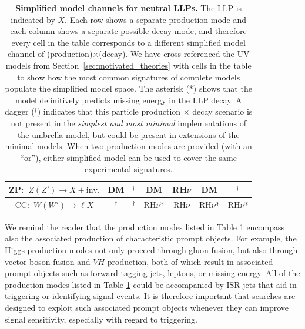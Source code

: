 \begin{table}
\begin{center}
\begin{tabular}{ |c|c|c|c|c|c|c| }
 \hline 
 ZP:~$Z(Z')\rightarrow X+\mathrm{inv.}$ & DM  & ${}^\dagger$ & DM &  RH$\nu$ & DM & ${}^\dagger$\\
  \hline
   CC:~$W(W')\rightarrow \ell X$ & ${}^\dagger$  & ${}^\dagger$ & RH$\nu$* & RH$\nu$ & RH$\nu$* & RH$\nu$* \\
  \hline
\end{tabular}
%
\end{center}
\caption{{\bf Simplified model channels for neutral LLPs.} The LLP is indicated by $X$. Each row shows a separate production mode and each column shows a separate possible decay mode, and therefore every cell in the table corresponds to a different simplified model channel of (production)$\times$(decay). We have cross-referenced the UV models from Section~\ref{sec:motivated_theories} with cells in the table to show how the most common signatures of complete models populate the simplified model space. The asterisk (*) shows that the model definitively predicts missing energy in the LLP decay. A dagger (${}^\dagger$) indicates that this particle production $\times$ decay scenario is not present in the \emph{simplest and most minimal} implementations of the umbrella model, but could be present in extensions of the minimal models. When two production modes are provided (with an ``or''), either simplified model can be used to cover the same experimental signatures.  }\label{tab:neutral_LLP}
\end{table}

We remind the reader that the production modes listed in Table
\ref{tab:neutral_LLP} encompass also the associated production of
characteristic prompt objects. For example, the Higgs production modes
not only proceed through gluon fusion, but also through vector boson
fusion and $VH$ production, both of which result in associated prompt
objects such as forward tagging jets, leptons, or missing
energy. All of the production modes listed in Table
\ref{tab:neutral_LLP} could be accompanied by ISR jets that aid in
triggering or identifying signal events. It is therefore important
that searches are designed to exploit such associated prompt objects
whenever they can improve signal sensitivity, especially with regard to triggering.

